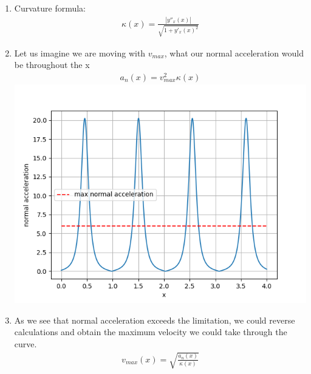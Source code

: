\documentclass{article}
\begin{document}
\begin{enumerate}
            \begin{enumerate}
                  \item Curvature formula:
                        \begin{align}
                              \kappa(x) = \frac{|y''_x(x)|}{\sqrt{1 + {y'_{x}(x)}^2}}
                        \end{align}
                  \item Let us imagine we are moving with $v_{max}$, what our normal acceleration would be throughout the x
                        \begin{align}
                              a_n(x) = v_{max}^2 \kappa(x)
                        \end{align}
                        \includegraphics[width=\linewidth]{normal_acceleration_lim.png}
                  \item As we see that normal acceleration exceeds the limitation,
                        we could reverse calculations and obtain the maximum velocity we could take through the curve.
                        \begin{align}
                              v_{max}(x) = \sqrt{\frac{a_n(x)}{\kappa(x)}}
                        \end{align}

\end{enumerate}
\end{enumerate}
\end{document}
